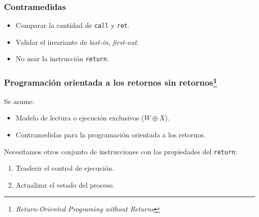 \documentclass{beamer}
\newcommand { \return } {\texttt{return}\xspace}
\newcommand { \vs } {\vspace{0.5cm}}
\begin{document}
\begin{frame}
    \frametitle{Contramedidas}
    \begin{itemize}
        \item Comparar la cantidad de \texttt{call} y \texttt{ret}. 
        \item Validar el invariante de \textit{last-in}, \textit{first-out}.
        \item No usar la instrucción \return.
    \end{itemize}
\end{frame}

\begin{frame}
    \frametitle{Programación orientada a los retornos sin retornos\footnote{\textit{Return-Oriented Programing without Returns}}}
    Se asume:

    \begin{itemize}
        \item Modelo de lectura o ejecución exclusivos ($W \oplus X$).
        \item Contramedidas para la programación orientada a los retornos.
    \end{itemize}
    \vs
    Necesitamos otros conjunto de instrucciones con las propiedades del \return:
    \begin{enumerate}
        \item Trasferir el control de ejecución.
        \item Actualizar el estado del proceso.
    \end{enumerate}
\end{frame}
\end{document}
